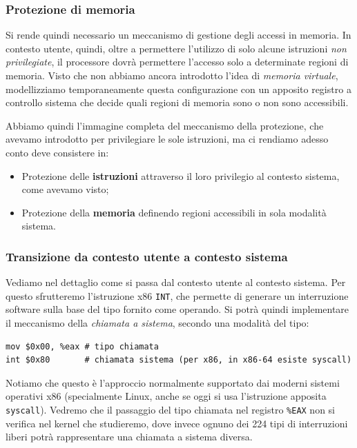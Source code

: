 \documentclass[a4paper,11pt]{article}
\begin{document}
\subsubsection{Protezione di memoria}
Si rende quindi necessario un meccanismo di gestione degli accessi in memoria.
In contesto utente, quindi, oltre a permettere l'utilizzo di solo alcune istruzioni \textit{non privilegiate}, il processore dovrà permettere l'accesso solo a determinate regioni di memoria. 
Visto che non abbiamo ancora introdotto l'idea di \textit{memoria virtuale}, modellizziamo temporaneamente questa configurazione con un apposito registro a controllo sistema che decide quali regioni di memoria sono o non sono accessibili.

Abbiamo quindi l'immagine completa del meccanismo della protezione, che avevamo introdotto per privilegiare le sole istruzioni, ma ci rendiamo adesso conto deve consistere in:
\begin{itemize}
	\item Protezione delle \textbf{istruzioni} attraverso il loro privilegio al contesto sistema, come avevamo visto;
	\item Protezione della \textbf{memoria} definendo regioni accessibili in sola modalità sistema.
\end{itemize}

\subsubsection{Transizione da contesto utente a contesto sistema}
Vediamo nel dettaglio come si passa dal contesto utente al contesto sistema.
Per questo sfrutteremo l'istruzione x86 \lstinline|INT|, che permette di generare un interruzione software sulla base del tipo fornito come operando.
Si potrà quindi implementare il meccanismo della \textit{chiamata a sistema}, secondo una modalità del tipo:
\begin{lstlisting}[language=assembler, style=codestyle]	
mov $0x00, %eax # tipo chiamata
int $0x80       # chiamata sistema (per x86, in x86-64 esiste syscall)
\end{lstlisting}
Notiamo che questo è l'approccio normalmente supportato dai moderni sistemi operativi x86 (specialmente Linux, anche se oggi si usa l'istruzione apposita \lstinline|syscall|).
Vedremo che il passaggio del tipo chiamata nel registro \lstinline|%EAX| non si verifica nel kernel che studieremo, dove invece ognuno dei 224 tipi di interruzioni liberi potrà rappresentare una chiamata a sistema diversa.
\end{document}
